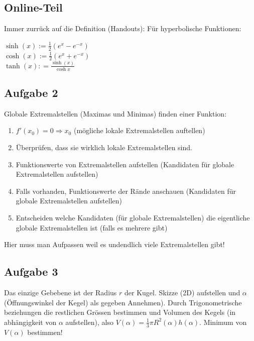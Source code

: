 \documentclass[11pt]{article} %
\begin{document}
\subsection{Online-Teil}
Immer zurrück auf die Definition (Handouts):
Für hyperbolische Funktionen:

$\sinh(x):= \frac{1}{2}(e^x - e^{-x})$\\
$\cosh(x):= \frac{1}{2}(e^x + e^{-x})$\\
$\tanh(x) : = \frac{\sinh(x)}{\cosh{x}}$
\subsection{Aufgabe 2}
Globale Extremalstellen (Maximas und Minimas) finden einer Funktion:
\begin{enumerate}
\item $f'(x_0) = 0 \Rightarrow x_0$ (mögliche lokale Extremalstellen auftellen)
\item Überprüfen, dass sie wirklich lokale Extremalstellen sind.
\item Funktionswerte von Extremalstellen aufstellen (Kandidaten für globale Extremalstellen aufstellen)
\item Falls vorhanden, Funktionswerte der Rände anschauen (Kandidaten für globale Extremalstellen aufstellen)
\item Entscheiden welche Kandidaten (für globale Extremalstellen) die eigentliche globale Extremalstellen ist (falls es mehrere gibt)
\end{enumerate}

Hier muss man Aufpassen weil es undendlich viele Extremalstellen gibt!
\subsection{Aufgabe 3}

Das einzige Gebebene ist der Radius $r$ der Kugel. Skizze (2D) aufstellen und $\alpha$ (Öffnungswinkel der Kegel) als gegeben Annehmen). Durch Trigonometrische beziehungen die restlichen Grössen bestimmen und Volumen des Kegels (in abhängigkeit von $\alpha$ aufstellen), also $V(\alpha)=\frac{1}{3} \pi R^2(\alpha) h(\alpha)$. Minimum von $V(\alpha)$ bestimmen! 
\end{document}

